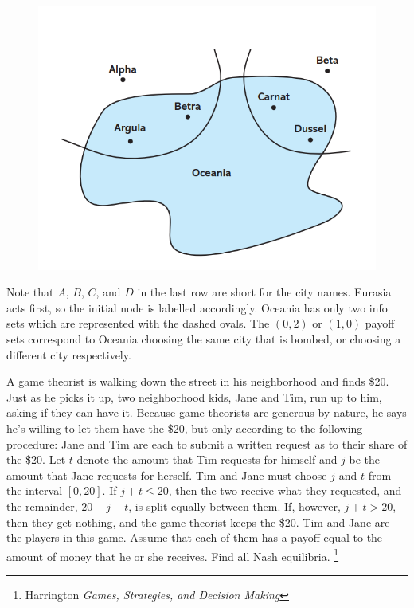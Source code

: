 \documentclass[addpoints ]{exam}
\begin{document}
\begin{questions}
\begin{figure}[!h]
  \centering
  \includegraphics[width=.4\linewidth]{figures/figPR2.1.png} 
\end{figure}

\begin{solution}
  \begin{center}
     
  \end{center} 

  Note that $A$, $B$, $C$, and $D$ in the last row are short for the city names.
  Eurasia acts first, so the initial node is labelled accordingly.
  Oceania has only two info sets which are represented with the dashed ovals.
  The $(0,2)$ or $(1,0)$ payoff sets correspond to Oceania choosing the same city that is bombed,
  or choosing a different city respectively.
\end{solution}

\newpage

\question[10] 
A game theorist is walking down the street in his neighborhood and finds \$20.
Just as he picks it up, two neighborhood kids, 
Jane and Tim,
run up to him, asking if they can have it.
Because game theorists are generous by nature, 
he says he's willing to let them have the \$20,
but only according to the following procedure:
Jane and Tim are each to submit a written request 
as to their share of the \$20. 
Let $t$ denote the amount that Tim requests for himself
and $j$ be the amount that Jane requests for herself.
Tim and Jane must choose $j$ and $t$ from the interval
$[0,20]$.
If $j + t \leq 20$, then the two receive what they requested,
and the remainder, $20 - j - t$, is split equally between them.
If, however, $j + t > 20$, then they get nothing, and the game theorist keeps the \$20.
Tim and Jane are the players in this game.
Assume that each of them has a payoff equal to the amount of money that he or she receives. 
Find all Nash equilibria.
\footnote{Harrington \textit{Games, Strategies, and Decision Making}}



\end{questions}
\end{document}
